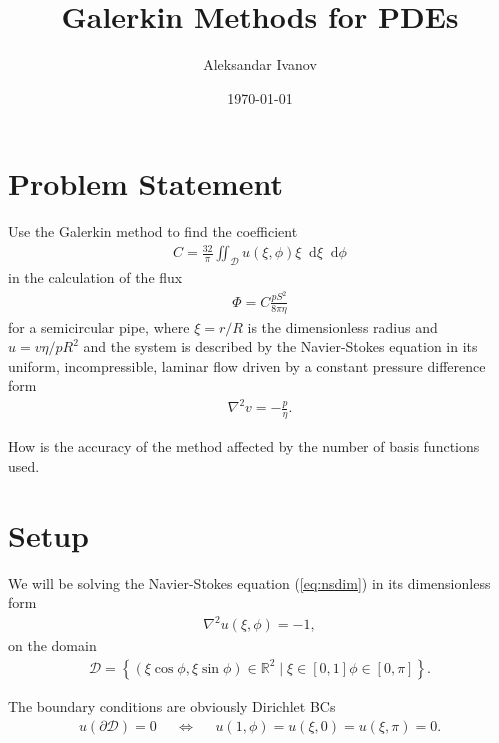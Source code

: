 \documentclass[10pt,a4paper,twocolumn]{article}
\newcommand{\diff}{\mathop{}\!\mathrm{d}}
\begin{document}
\title{Galerkin Methods for PDEs}
\author{Aleksandar Ivanov}
\date{\today}
\maketitle

\section{Problem Statement}

Use the Galerkin method to find the coefficient
%
\begin{align}
    C = \frac{32}{\pi} \iint_{\mathcal{D}} u(\xi, \phi) \xi \diff \xi \diff \phi
\end{align}
%
in the calculation of the flux
%
\begin{align}
    \Phi = C \frac{p S^2}{8 \pi \eta}
\end{align}
%
for a semicircular pipe, where $\xi = r/R$ is the dimensionless radius and $u = v \eta / p R^2$ and the system is described by the Navier-Stokes equation in its uniform, incompressible, laminar flow driven by a constant pressure difference form
%
\begin{align}\label{eq:nsdim}
    \nabla^2 v = - \frac{p}{\eta}.
\end{align}

How is the accuracy of the method affected by the number of basis functions used.

\section{Setup}

We will be solving the Navier-Stokes equation (\cref{eq:nsdim}) in its dimensionless form
%
\begin{align}\label{eq:ns}
    \nabla^2 u(\xi, \phi) = -1,
\end{align}
%
on the domain
%
\begin{align}
    \mathcal{D} = \left\lbrace (\xi \cos \phi, \xi \sin \phi) \in \mathbb{R}^2 \mid \xi \in [0,1] \phi \in [0, \pi] \right\rbrace.
\end{align}

The boundary conditions are obviously Dirichlet BCs
%
\begin{align}
    &u(\partial \mathcal{D})=0& &\Leftrightarrow& &u(1,\phi) = u(\xi, 0) = u(\xi, \pi) = 0.&
\end{align}
\end{document}
